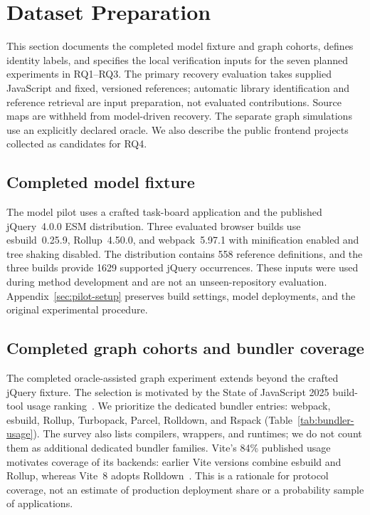 \section{Dataset Preparation}
\label{sec:datasets}
\suppressfloats[t]
This section documents the completed model fixture and graph cohorts, defines identity labels, and specifies the local verification inputs for the seven planned experiments in RQ1--RQ3. The primary recovery evaluation takes supplied JavaScript and fixed, versioned references; automatic library identification and reference retrieval are input preparation, not evaluated contributions. Source maps are withheld from model-driven recovery. The separate graph simulations use an explicitly declared oracle. We also describe the public frontend projects collected as candidates for RQ4.

\subsection{Completed model fixture}
\label{sec:model-fixture}
The model pilot uses a crafted task-board application and the published jQuery~4.0.0 ESM distribution. Three evaluated browser builds use esbuild~0.25.9, Rollup~4.50.0, and webpack~5.97.1 with minification enabled and tree shaking disabled. The distribution contains 558 reference definitions, and the three builds provide 1629 supported jQuery occurrences. These inputs were used during method development and are not an unseen-repository evaluation. Appendix~\ref{sec:pilot-setup} preserves build settings, model deployments, and the original experimental procedure.

\subsection{Completed graph cohorts and bundler coverage}
\label{sec:bundler-selection}
The completed oracle-assisted graph experiment extends beyond the crafted jQuery fixture. The selection is motivated by the State of JavaScript 2025 build-tool usage ranking~\cite{stateofjs2025}. We prioritize the dedicated bundler entries: webpack, esbuild, Rollup, Turbopack, Parcel, Rolldown, and Rspack (Table~\ref{tab:bundler-usage}). The survey also lists compilers, wrappers, and runtimes; we do not count them as additional dedicated bundler families. Vite's 84\% published usage motivates coverage of its backends: earlier Vite versions combine esbuild and Rollup, whereas Vite~8 adopts Rolldown~\cite{vite8}. This is a rationale for protocol coverage, not an estimate of production deployment share or a probability sample of applications.

